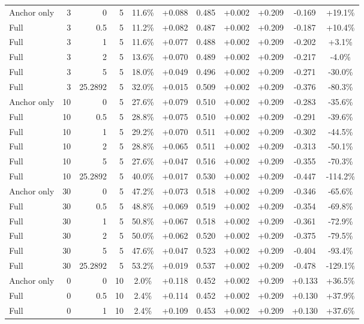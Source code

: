\begin{table}[htbp]
\begin{tabular}{lrrrccccccc}
Anchor only & 3 & 0 & 5 & 11.6\% & +0.088 & 0.485 & +0.002 & +0.209 & -0.169 & +19.1\% \\
Full & 3 & 0.5 & 5 & 11.2\% & +0.082 & 0.487 & +0.002 & +0.209 & -0.187 & +10.4\% \\
Full & 3 & 1 & 5 & 11.6\% & +0.077 & 0.488 & +0.002 & +0.209 & -0.202 & +3.1\% \\
Full & 3 & 2 & 5 & 13.6\% & +0.070 & 0.489 & +0.002 & +0.209 & -0.217 & -4.0\% \\
Full & 3 & 5 & 5 & 18.0\% & +0.049 & 0.496 & +0.002 & +0.209 & -0.271 & -30.0\% \\
Full & 3 & 25.2892 & 5 & 32.0\% & +0.015 & 0.509 & +0.002 & +0.209 & -0.376 & -80.3\% \\
Anchor only & 10 & 0 & 5 & 27.6\% & +0.079 & 0.510 & +0.002 & +0.209 & -0.283 & -35.6\% \\
Full & 10 & 0.5 & 5 & 28.8\% & +0.075 & 0.510 & +0.002 & +0.209 & -0.291 & -39.6\% \\
Full & 10 & 1 & 5 & 29.2\% & +0.070 & 0.511 & +0.002 & +0.209 & -0.302 & -44.5\% \\
Full & 10 & 2 & 5 & 28.8\% & +0.065 & 0.511 & +0.002 & +0.209 & -0.313 & -50.1\% \\
Full & 10 & 5 & 5 & 27.6\% & +0.047 & 0.516 & +0.002 & +0.209 & -0.355 & -70.3\% \\
Full & 10 & 25.2892 & 5 & 40.0\% & +0.017 & 0.530 & +0.002 & +0.209 & -0.447 & -114.2\% \\
Anchor only & 30 & 0 & 5 & 47.2\% & +0.073 & 0.518 & +0.002 & +0.209 & -0.346 & -65.6\% \\
Full & 30 & 0.5 & 5 & 48.8\% & +0.069 & 0.519 & +0.002 & +0.209 & -0.354 & -69.8\% \\
Full & 30 & 1 & 5 & 50.8\% & +0.067 & 0.518 & +0.002 & +0.209 & -0.361 & -72.9\% \\
Full & 30 & 2 & 5 & 50.0\% & +0.062 & 0.520 & +0.002 & +0.209 & -0.375 & -79.5\% \\
Full & 30 & 5 & 5 & 47.6\% & +0.047 & 0.523 & +0.002 & +0.209 & -0.404 & -93.4\% \\
Full & 30 & 25.2892 & 5 & 53.2\% & +0.019 & 0.537 & +0.002 & +0.209 & -0.478 & -129.1\% \\
Anchor only & 0 & 0 & 10 & 2.0\% & +0.118 & 0.452 & +0.002 & +0.209 & +0.133 & +36.5\% \\
Full & 0 & 0.5 & 10 & 2.4\% & +0.114 & 0.452 & +0.002 & +0.209 & +0.130 & +37.9\% \\
Full & 0 & 1 & 10 & 2.4\% & +0.109 & 0.453 & +0.002 & +0.209 & +0.130 & +37.6\% \\

\end{tabular}
\end{table}

